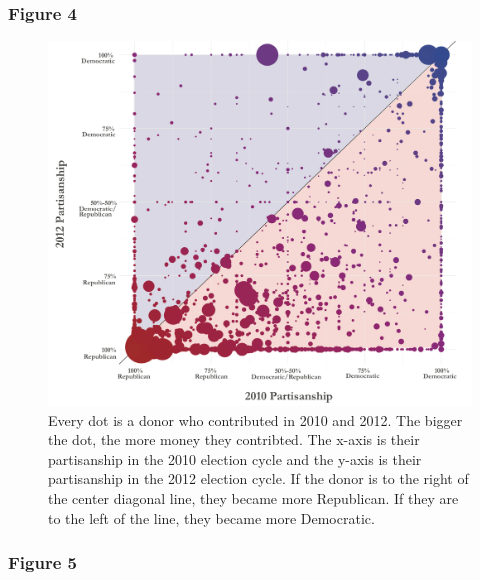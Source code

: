 \documentclass[12pt,]{article}
\begin{document}
\newpage

\hypertarget{figure-4}{%
\subsubsection{Figure 4}\label{figure-4}}

\begin{figure}
\includegraphics[width=1\linewidth]{../figures/fig3} \caption{Every dot is a donor who contributed in 2010 and 2012. The bigger the dot, the more money they contribted. The x-axis is their partisanship in the 2010 election cycle and the y-axis is their partisanship in the 2012 election cycle. If the donor is to the right of the center diagonal line, they became more Republican. If they are to the left of the line, they became more Democratic.}\label{fig:unnamed-chunk-14}
\end{figure}

\newpage

\hypertarget{figure-5}{%
\subsubsection{Figure 5}\label{figure-5}}
\end{document}
